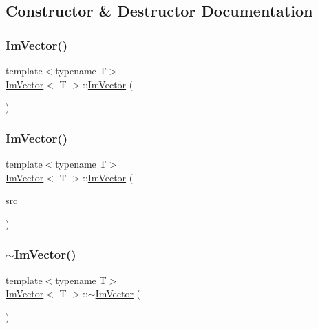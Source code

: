 \subsection{Constructor \& Destructor Documentation}
\mbox{\label{structImVector_a547fff373659fd848c3ecc6b25a83f25}} 
\subsubsection{\texorpdfstring{Im\+Vector()}{ImVector()}\hspace{0.1cm}{\footnotesize\ttfamily [1/2]}}
{\footnotesize\ttfamily template$<$typename T$>$ \\
\hyperlink{structImVector}{Im\+Vector}$<$ T $>$\+::\hyperlink{structImVector}{Im\+Vector} (\begin{DoxyParamCaption}{ }\end{DoxyParamCaption})\hspace{0.3cm}{\ttfamily [inline]}}

\mbox{\label{structImVector_a6e2ee59d8b2fa1583617a2110a56aed4}} 
\subsubsection{\texorpdfstring{Im\+Vector()}{ImVector()}\hspace{0.1cm}{\footnotesize\ttfamily [2/2]}}
{\footnotesize\ttfamily template$<$typename T$>$ \\
\hyperlink{structImVector}{Im\+Vector}$<$ T $>$\+::\hyperlink{structImVector}{Im\+Vector} (\begin{DoxyParamCaption}\item[{const \hyperlink{structImVector}{Im\+Vector}$<$ T $>$ \&}]{src }\end{DoxyParamCaption})\hspace{0.3cm}{\ttfamily [inline]}}

\mbox{\label{structImVector_a9b782359ca26eaa1a6a6138fcf341c54}} 
\subsubsection{\texorpdfstring{$\sim$\+Im\+Vector()}{~ImVector()}}
{\footnotesize\ttfamily template$<$typename T$>$ \\
\hyperlink{structImVector}{Im\+Vector}$<$ T $>$\+::$\sim$\hyperlink{structImVector}{Im\+Vector} (\begin{DoxyParamCaption}{ }\end{DoxyParamCaption})\hspace{0.3cm}{\ttfamily [inline]}}



